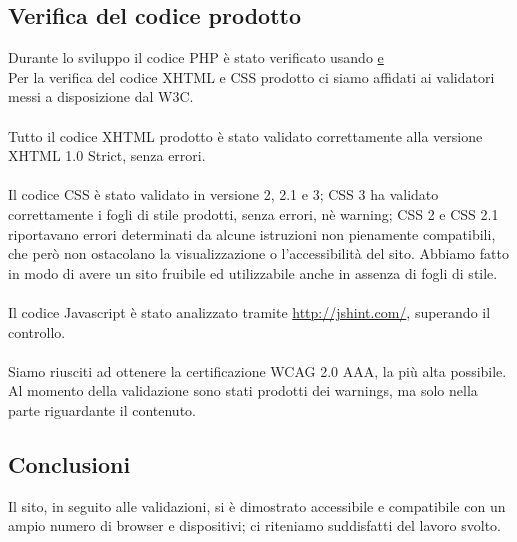 {	\subsection{Verifica del codice prodotto}{
		Durante lo sviluppo il codice PHP è stato verificato  usando \href{http://phpcodechecker.com/} e \href{http://phpfiddle.org/}
		\\
		Per la verifica del codice XHTML e CSS prodotto ci siamo affidati ai validatori messi a disposizione dal W3C.\\
		\\
		Tutto il codice XHTML prodotto è stato validato correttamente alla versione XHTML 1.0 Strict, senza errori.\\
		\\
		Il codice CSS è stato validato in versione 2, 2.1 e 3; CSS 3 ha validato correttamente i fogli di stile prodotti, senza errori, nè warning; CSS 2 e CSS 2.1 riportavano errori determinati da alcune istruzioni non pienamente compatibili, che però non ostacolano la visualizzazione o l'accessibilità del sito. Abbiamo fatto in modo di avere un sito fruibile ed utilizzabile anche in assenza di fogli di stile.\\
		\\
		Il codice Javascript è stato analizzato tramite \url{http://jshint.com/}, superando il controllo.\\
		\\
		Siamo riusciti ad ottenere la certificazione WCAG 2.0 AAA, la più alta possibile. Al momento della validazione sono stati prodotti dei warnings, ma solo nella parte riguardante il contenuto. %
	}
	
	\subsection{Conclusioni}
		Il sito, in seguito alle validazioni, si è dimostrato accessibile e compatibile con un ampio numero di browser e dispositivi; ci riteniamo suddisfatti del lavoro svolto.
}